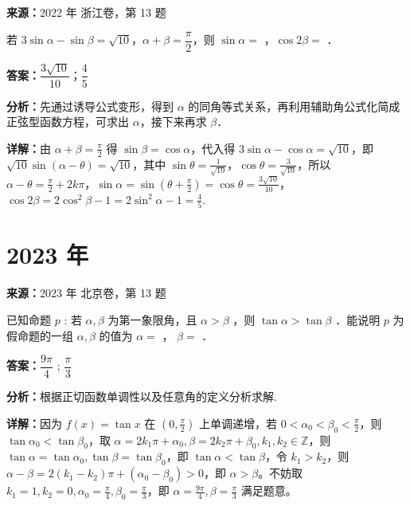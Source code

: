 \begin{question}[points=6]
\textbf{来源：}2022 年 浙江卷，第 13 题\par
若 $3\sin\alpha - \sin\beta = \sqrt{10}$，$\alpha+\beta = \dfrac{\pi}{2}$，则 $\sin\alpha =$ ，$\cos 2\beta =$ ．
\begin{solution}
\textbf{答案：}$\dfrac{3\sqrt{10}}{10}$；$\dfrac{4}{5}$

\textbf{分析：}先通过诱导公式变形，得到 $\alpha$ 的同角等式关系，再利用辅助角公式化简成正弦型函数方程，可求出 $\alpha$，接下来再求 $\beta$．

\textbf{详解：}由 $\alpha+\beta=\frac{\pi}{2}$ 得 $\sin\beta = \cos\alpha$，代入得 $3\sin\alpha - \cos\alpha = \sqrt{10}$，即 $\sqrt{10}\sin(\alpha-\theta)=\sqrt{10}$，其中 $\sin\theta=\frac{1}{\sqrt{10}}$，$\cos\theta=\frac{3}{\sqrt{10}}$，所以 $\alpha-\theta = \frac{\pi}{2}+2k\pi$，$\sin\alpha = \sin(\theta+\frac{\pi}{2}) = \cos\theta = \frac{3\sqrt{10}}{10}$，$\cos2\beta = 2\cos^2\beta-1 = 2\sin^2\alpha-1 = \frac{4}{5}$.
\end{solution}
\end{question}

\section*{2023 年}

\begin{question}[points=5]
\textbf{来源：}2023 年 北京卷，第 13 题\par
已知命题 $p$ : 若 $\alpha, \beta$ 为第一象限角，且 $\alpha > \beta$ ，则 $\tan \alpha > \tan \beta$ ．能说明 $p$ 为假命题的一组 $\alpha, \beta$ 的值为 $\alpha =$ ， $\beta =$ ．
\begin{solution}
\textbf{答案：}$\dfrac{9\pi}{4}$ ; $\dfrac{\pi}{3}$

\textbf{分析：}根据正切函数单调性以及任意角的定义分析求解.

\textbf{详解：}因为 $f(x)=\tan x$ 在 $(0,\frac{\pi}{2})$ 上单调递增，若 $0<\alpha_0<\beta_0<\frac{\pi}{2}$，则 $\tan\alpha_0<\tan\beta_0$，取 $\alpha=2k_1\pi+\alpha_0, \beta=2k_2\pi+\beta_0, k_1,k_2\in\mathbb{Z}$，则 $\tan\alpha=\tan\alpha_0, \tan\beta=\tan\beta_0$，即 $\tan\alpha<\tan\beta$，令 $k_1>k_2$，则 $\alpha-\beta=2(k_1-k_2)\pi+(\alpha_0-\beta_0)>0$，即 $\alpha>\beta$。不妨取 $k_1=1,k_2=0,\alpha_0=\frac{\pi}{4},\beta_0=\frac{\pi}{3}$，即 $\alpha=\frac{9\pi}{4},\beta=\frac{\pi}{3}$ 满足题意。
\end{solution}
\end{question}

